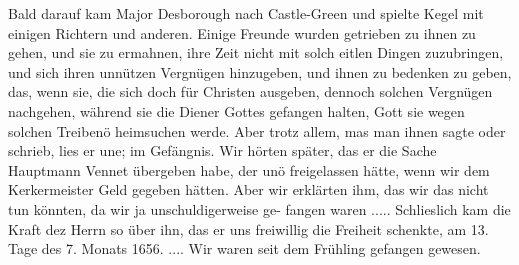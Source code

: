 
Bald darauf kam Major Desborough nach Castle-Green und
spielte Kegel mit einigen Richtern und anderen. Einige Freunde
wurden getrieben zu ihnen zu gehen, und sie zu ermahnen, ihre
Zeit nicht mit solch eitlen Dingen zuzubringen, und sich ihren
unnützen Vergnügen hinzugeben, und ihnen zu bedenken zu geben,
das, wenn sie, die sich doch für Christen ausgeben, dennoch solchen
Vergnügen nachgehen, während sie die Diener Gottes gefangen
halten, Gott sie wegen solchen Treibenö heimsuchen werde. Aber
trotz allem, mas man ihnen sagte oder schrieb, lies er une; im
Gefängnis. Wir hörten später, das er die Sache Hauptmann
Vennet übergeben habe, der unö freigelassen hätte, wenn wir
dem Kerkermeister Geld gegeben hätten. Aber wir erklärten ihm,
das wir das nicht tun könnten, da wir ja unschuldigerweise ge-
fangen waren ..... Schlieslich kam die Kraft dez Herrn so
über ihn, das er uns freiwillig die Freiheit schenkte, am 13. Tage
des 7. Monats 1656. .... Wir waren seit dem Frühling
gefangen gewesen.